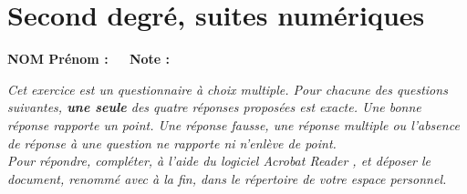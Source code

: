 \documentclass[a4paper,11pt]{article}
\begin{document}
\part{Second degré, suites numériques}

\medskip

\begin{Form}

\textbf{\Large NOM Prénom : }~\raisebox{-.25\baselineskip}{\TextField[value=........................,width=10cm,height=2em,charsize=14pt,name=nomprenom,bordercolor=black]{}} \hfill~\textbf{\Large Note : }~\raisebox{-.25\baselineskip}{\TextField[width=2em,height=2em,charsize=14pt,name=note,bordercolor=black,color=1 0 0,align=1]{}}

\bigskip

\emph{Cet exercice est un questionnaire à choix multiple. Pour chacune des questions suivantes, \textbf{une seule} des quatre réponses proposées est exacte. Une bonne réponse rapporte un point. Une réponse fausse, une réponse multiple ou l’absence de réponse à une question ne rapporte ni n’enlève de point.\\
Pour répondre, compléter, à l'aide du logiciel {\small \red \textsf{Acrobat Reader} }, et déposer le document, renommé avec {\normalfont{}} à la fin, dans le répertoire {\normalfont{}} de votre espace personnel.}


\end{Form}
\end{document}
